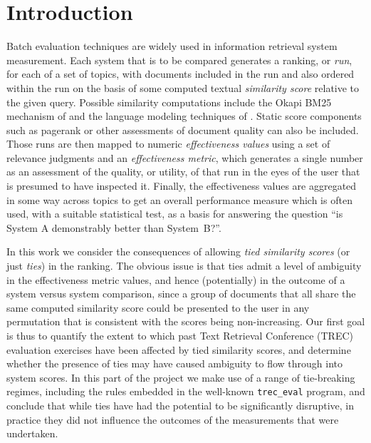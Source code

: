 \section{Introduction}
\label{sec-intro}

Batch evaluation techniques are widely used in information retrieval
system measurement.
Each system that is to be compared generates a ranking, or
{\emph{run}}, for each of a set of topics, with documents included in
the run and also ordered within the run on the basis of some computed
textual {\emph{similarity score}} relative to the given query.
Possible similarity computations include the Okapi BM25 mechanism of
{\citet{rwjhg94trec}} and the language modeling techniques of
{\citet{pc98sigir}}.
Static score components such as pagerank or other assessments of
document quality can also be included.
Those runs are then mapped to numeric {\emph{effectiveness values}}
using a set of relevance judgments and an {\emph{effectiveness
metric}}, which generates a single number as an assessment of the
quality, or utility, of that run in the eyes of the user that is
presumed to have inspected it.
Finally, the effectiveness values are aggregated in some way across
topics to get an overall performance measure which is often used,
with a suitable statistical test, as a basis for answering the
question ``is System A demonstrably better than System~B?''.

In this work we consider the consequences of allowing {\emph{tied
similarity scores}} (or just {\emph{ties}}) in the ranking.
The obvious issue is that ties admit a level of ambiguity in the
effectiveness metric values, and hence (potentially) in the outcome
of a system versus system comparison, since a group of documents that
all share the same computed similarity score could be presented to
the user in any permutation that is consistent with the scores being
non-increasing.
Our first goal is thus to quantify the extent to which past Text
Retrieval Conference (TREC) evaluation exercises have been affected
by tied similarity scores, and determine whether the presence of
ties may have caused ambiguity to flow through into system
scores.
In this part of the project we make use of a range of tie-breaking
regimes, including the rules embedded in the well-known
{\tt{trec\_eval}} program, and conclude that while ties have had the
potential to be significantly disruptive, in practice they did not
influence the outcomes of the measurements that were undertaken.

